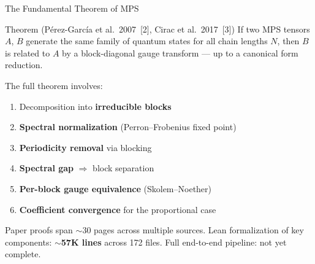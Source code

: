 \documentclass[aspectratio=169,10pt]{beamer}
\begin{document}
\begin{frame}{The Fundamental Theorem of MPS}
    \begin{block}{Theorem (P\'erez-Garc\'ia et al.~2007~[2], Cirac et al.~2017~[3])}
      If two MPS tensors $A$, $B$ generate the same family of quantum states for all chain lengths $N$, then $B$ is related to $A$ by a block-diagonal gauge transform --- up to a canonical form reduction.
    \end{block}
    \vspace{0.5em}
    The full theorem involves:
    \begin{enumerate}
        \item Decomposition into \textbf{irreducible blocks}
        \item \textbf{Spectral normalization} (Perron--Frobenius fixed point)
        \item \textbf{Periodicity removal} via blocking
        \item \textbf{Spectral gap} $\Rightarrow$ block separation
        \item \textbf{Per-block gauge equivalence} (Skolem--Noether)
        \item \textbf{Coefficient convergence} for the proportional case
    \end{enumerate}
    \vspace{0.4em}
    \textcolor{dimwhite}{\footnotesize Paper proofs span $\sim$30 pages across multiple sources. Lean formalization of key components: \textbf{$\sim$57K lines} across 172 files. Full end-to-end pipeline: not yet complete.}
\end{frame}
\end{document}
